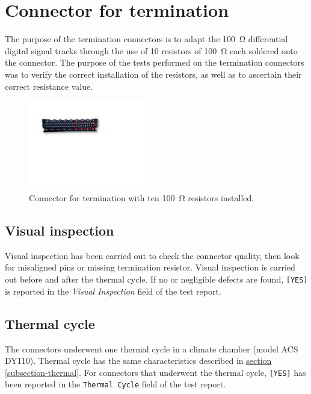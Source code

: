 
\section{Connector for termination}

The purpose of the termination connectors is to adapt the \SI{100}{\ohm} differential digital signal tracks through the use of 10 resistors of \SI{100}{\ohm} each soldered onto the connector. The purpose of the tests performed on the termination connectors was to verify the correct installation of the resistors, as well as to ascertain their correct resistance value.

\begin{figure}[ht]
    \centering
    \includegraphics[width=0.45\textwidth]{Images/chap2/term_conn.pdf}
    \caption{Connector for termination with ten \SI{100}{\ohm} resistors installed.}
    \label{figTermConnector}
\end{figure}

\subsection{Visual inspection}
Visual inspection has been carried out to check the connector quality, then look for misaligned pins or missing termination resistor. Visual inspection is carried out before and after the thermal cycle. If no or negligible defects are found, \texttt{[YES]} is reported in the \textit{Visual Inspection} field of the test report.

\subsection{Thermal cycle}
The connectors underwent one thermal cycle in a climate chamber (model ACS DY110). Thermal cycle has the same characteristics described in \hyperref[subsection-thermal]{section \ref{subsection-thermal}}. For connectors that underwent the thermal cycle, \texttt{[YES]} has been reported in the \texttt{Thermal Cycle} field of the test report.

